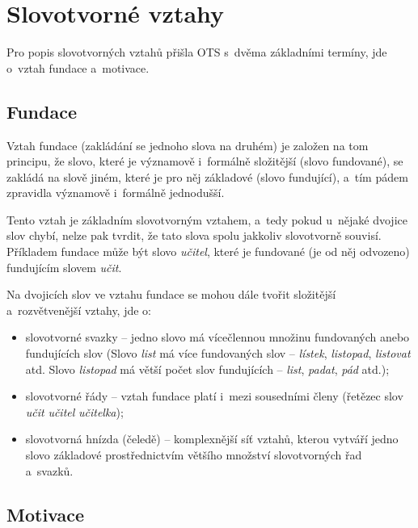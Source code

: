 \hypertarget{slovotvornuxe9-vztahy}{%
\section{Slovotvorné vztahy}\label{slovotvornuxe9-vztahy}}

Pro popis slovotvorných vztahů přišla OTS s~dvěma základními termíny,
jde o~vztah fundace a~motivace.

\hypertarget{fundace}{%
\subsection{Fundace}\label{fundace}}

Vztah fundace (zakládání se jednoho slova na druhém) je založen na tom
principu, že slovo, které je významově i~formálně složitější (slovo
fundované), se zakládá na slově jiném, které je pro něj základové (slovo
fundující), a~tím pádem zpravidla významově i~formálně jednodušší.
\parencite[95]{dokulil00}

Tento vztah je základním slovotvorným vztahem, a~tedy pokud u~nějaké
dvojice slov chybí, nelze pak tvrdit, že tato slova spolu jakkoliv
slovotvorně souvisí. Příkladem fundace může být slovo \emph{učitel},
které je fundované (je od něj odvozeno) fundujícím slovem \emph{učit}.

Na dvojicích slov ve vztahu fundace se mohou dále tvořit složitější
a~rozvětvenější vztahy, jde o:

\begin{itemize}
\tightlist
\item
  slovotvorné svazky -- jedno slovo má vícečlennou množinu fundovaných
  anebo fundujících slov (Slovo \emph{list} má více fundovaných slov --
  \emph{lístek}, \emph{listopad}, \emph{listovat} atd. Slovo
  \emph{listopad} má větší počet slov fundujících -- \emph{list},
  \emph{padat}, \emph{pád} atd.);
\item
  slovotvorné řády -- vztah fundace platí i~mezi sousedními členy
  (řetězec slov \emph{učit} \rigtharrow \emph{učitel}
  \rigtharrow \emph{učitelka});
\item
  slovotvorná hnízda (čeledě) -- komplexnější síť vztahů, kterou vytváří
  jedno slovo základové prostřednictvím většího množství slovotvorných
  řad a~svazků.~\parencite[12--13]{dokulil62}
\end{itemize}

\hypertarget{motivace}{%
\subsection{Motivace}\label{motivace}}

